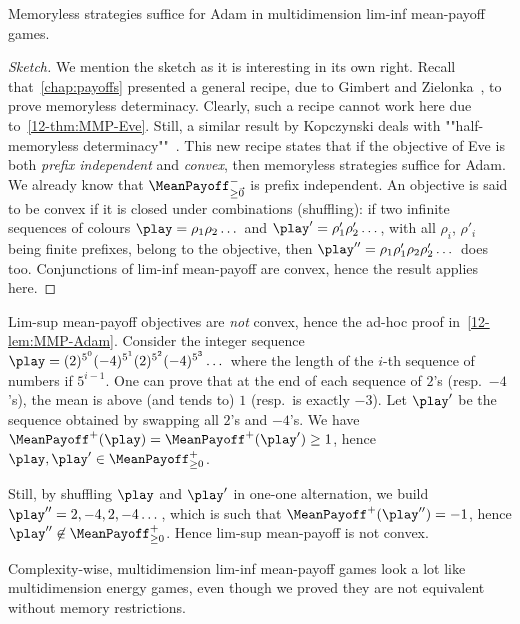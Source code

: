 \begin{lemma}
\label{12-lem:MPlimInfAdam}
Memoryless strategies suffice for Adam in multidimension lim-inf mean-payoff games.
\end{lemma}

\begin{proof}[Sketch]
We mention the sketch as it is interesting in its own right. Recall that~\cref{chap:payoffs} presented a general recipe, due to Gimbert and Zielonka~\cite{Gimbert&Zielonka:2004,Gimbert&Zielonka:2005}, to prove memoryless determinacy. Clearly, such a recipe cannot work here due to~\cref{12-thm:MMP-Eve}. Still, a similar result by Kopczynski deals with ""half-memoryless determinacy""~\cite{Kopczynski:2006}. This new recipe states that if the objective of Eve is both \textit{prefix independent} and \textit{convex}, then memoryless strategies suffice for Adam. We already know that $\MeanPayoff^{-}_{\geq \vec{0}}$ is prefix independent. An objective is said to be convex if it is closed under combinations (shuffling): if two infinite sequences of colours $\play = \rho_1 \rho_2 \ldots{}$ and $\play' = \rho'_1 \rho'_2 \ldots{}$, with all $\rho_i$, $\rho'_i$ being finite prefixes, belong to the objective, then $\play'' = \rho_1 \rho'_1 \rho_2 \rho'_2 \ldots{}$ does too. Conjunctions of lim-inf mean-payoff are convex, hence the result applies here.
\end{proof}

\begin{remark}
Lim-sup mean-payoff objectives are \textit{not} convex, hence the ad-hoc proof in~\cref{12-lem:MMP-Adam}. Consider the integer sequence $\play = (2)^{5^0} (-4)^{5^1} (2)^{5^2} (-4)^{5^3}\ldots{}$ where the length of the $i$-th sequence of numbers if $5^{i-1}$. One can prove that at the end of each sequence of $2$'s (resp.~$-4$'s), the mean is above (and tends to) $1$ (resp.~is exactly $-3$). Let $\play'$ be the sequence obtained by swapping all $2$'s and $-4$'s. We have $\MeanPayoff^{+}(\play) = \MeanPayoff^{+}(\play') \geq 1$, hence $\play, \play' \in \MeanPayoff^{+}_{\geq 0}$.

Still, by shuffling $\play$ and $\play'$ in one-one alternation, we build $\play'' = 2, -4, 2, -4 \ldots{}$, which is such that $\MeanPayoff^{+}(\play'') = -1$, hence  $\play'' \not\in \MeanPayoff^{+}_{\geq 0}$. Hence lim-sup mean-payoff is not convex.
\end{remark}

Complexity-wise, multidimension lim-inf mean-payoff games look a lot like multidimension energy games, even though we proved they are not equivalent without memory restrictions.

